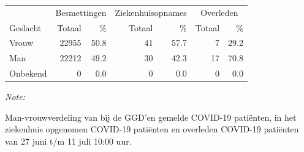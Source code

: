 \documentclass[
  english,
  man,floatsintext]{apa6}
\begin{document}
\begin{table}
\centering\begingroup\fontsize{11}{13}\selectfont

\begin{threeparttable}
\begin{tabular}{lrrrrrr}
\toprule
\multicolumn{1}{c}{ } & \multicolumn{2}{c}{Besmettingen} & \multicolumn{2}{c}{Ziekenhuisopnames} & \multicolumn{2}{c}{Overleden} \\
\cmidrule(l{3pt}r{3pt}){2-3} \cmidrule(l{3pt}r{3pt}){4-5} \cmidrule(l{3pt}r{3pt}){6-7}
Geslacht & Totaal & \% & Totaal & \% & Totaal & \%\\
\midrule
Vrouw & 22955 & 50.8 & 41 & 57.7 & 7 & 29.2\\
Man & 22212 & 49.2 & 30 & 42.3 & 17 & 70.8\\
Onbekend & 0 & 0.0 & 0 & 0.0 & 0 & 0.0\\
\bottomrule
\end{tabular}
\begin{tablenotes}
\item \textit{Note: } 
\item Man-vrouwverdeling van bij de GGD’en gemelde COVID-19 patiënten, in het ziekenhuis opgenomen COVID-19 patiënten en overleden COVID-19 patiënten van 27 juni t/m 11 juli 10:00 uur.
\end{tablenotes}
\end{threeparttable}
\endgroup{}
\end{table}
\newpage
\end{document}
